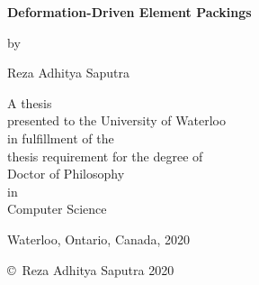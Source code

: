 \pagestyle{empty}

\begin{titlepage}
        \begin{center}
        \vspace*{1.0cm}

        \Huge
        {\bf Deformation-Driven Element Packings }

        \vspace*{1.0cm}

        \normalsize
        by \\

        \vspace*{1.0cm}

        \Large
        Reza Adhitya Saputra \\

        \vspace*{3.0cm}

        \normalsize
        A thesis \\
        presented to the University of Waterloo \\ 
        in fulfillment of the \\
        thesis requirement for the degree of \\
        Doctor of Philosophy \\
        in \\
        Computer Science \\

        \vspace*{2.0cm}

        Waterloo, Ontario, Canada, 2020 \\

        \vspace*{1.0cm}

        \copyright\ Reza Adhitya Saputra 2020 \\
        \end{center}
\end{titlepage}

\pagestyle{plain}
\setcounter{page}{2}

